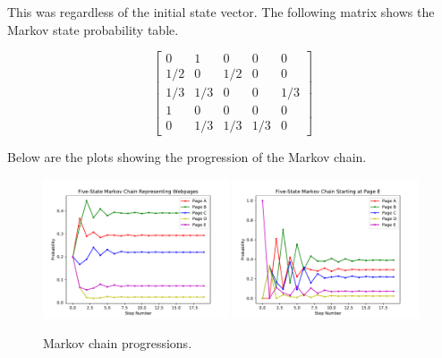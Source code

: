 \documentclass{article}
\begin{document}
This was regardless of the initial state vector. The following
matrix shows the Markov state probability table.

\begin{equation*}
    \begin{bmatrix}
        0 & 1 & 0 & 0 & 0\\
        1/2 & 0 & 1/2 & 0 & 0 \\
        1/3 & 1/3 & 0 & 0 & 1/3 \\
        1 & 0 & 0 & 0 & 0\\
        0 & 1/3 & 1/3 & 1/3 & 0
    \end{bmatrix}
\end{equation*}

Below are the plots showing the progression of the
Markov chain.

\begin{figure}[H]
    \centering
    \includegraphics[width=0.49\textwidth]{Images/Problem2Figure1}
    \includegraphics[width=0.49\textwidth]{Images/Problem2Figure2}
    \caption{Markov chain progressions.}
    \label{plot:google}
\end{figure}
\end{document}
